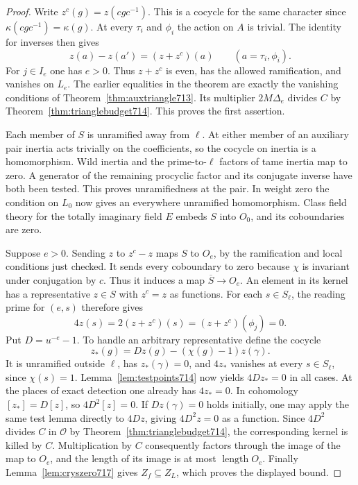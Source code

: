 \documentclass[a4paper,11pt]{article}
\theoremstyle{definition}
\theoremstyle{remark}
\newcommand{\len}{\operatorname{length}}\newcommand{\Res}{\operatorname*{Res}}
\numberwithin{equation}{section}
\begin{document}
\begin{proof}
Write \(z^c(g)=z(cgc^{-1})\). This is a cocycle for the same
character since \(\kappa(cgc^{-1})=\kappa(g)\).
At every \(\tau_i\) and \(\phi_i\) the action on \(A\) is
trivial. The identity for inverses then gives
\[
         z(a)-z(a')=(z+z^c)(a)
           \qquad(a=\tau_i,\phi_i).
\]
For \(j\in I_e\) one has \(e>0\). Thus \(z+z^c\) is even,
has the allowed ramification, and vanishes on \(L_e\).
The earlier equalities in the theorem are exactly the vanishing
conditions of Theorem~\ref{thm:auxtriangle713}. Its multiplier
\(2M\Delta_e\) divides \(C\) by
Theorem~\ref{thm:trianglebudget714}. This proves the first assertion.

Each member of \(S\) is unramified away from \(\ell\).
At either member of an auxiliary pair inertia acts trivially
on the coefficients, so the cocycle on inertia is a homomorphism.
Wild inertia and the prime-to-\(\ell\) factors of tame inertia
map to zero. A generator of the remaining procyclic factor
and its conjugate inverse have both been tested. This proves
unramifiedness at the pair. In weight zero the condition on
\(L_0\) now gives an everywhere unramified homomorphism. Class
field theory for the totally imaginary field \(E\) embeds
\(S\) into \(O_0\), and its coboundaries are zero.

Suppose \(e>0\). Sending \(z\) to \(z^c-z\) maps \(S\)
to \(O_e\), by the ramification and local conditions just
checked. It sends every coboundary to zero because \(\chi\)
is invariant under conjugation by \(c\). Thus it induces
a map \(\overline S\to O_e\). An element in its kernel has
a representative \(z\in S\) with \(z^c=z\) as functions.
For each \(s\in S_\ell\), the reading prime for \((e,s)\)
therefore gives
\[
       4z(s)=2(z+z^c)(s)=(z+z^c)(\phi_j)=0 .
\]
Put \(D=u^{-e}-1\). To handle an arbitrary representative
define the cocycle
\[
            z_*(g)=D z(g)-(\chi(g)-1)z(\gamma).
\]
It is unramified outside \(\ell\), has \(z_*(\gamma)=0\),
and \(4z_*\) vanishes at every \(s\in S_\ell\), since
\(\chi(s)=1\). Lemma~\ref{lem:testpoints714} now yields
\(4D z_*=0\) in all cases. At the places of exact detection
one already has \(4z_*=0\). In cohomology
\([z_*]=D[z]\), so \(4D^2[z]=0\).
If \(Dz(\gamma)=0\) holds initially, one may apply the same
test lemma directly to \(4Dz\), giving \(4D^2z=0\) as a
function. Since \(4D^2\) divides \(C\) in \(\mathcal O\)
by Theorem~\ref{thm:trianglebudget714}, the corresponding
kernel is killed by \(C\). Multiplication by \(C\) consequently
factors through the image of the map to \(O_e\), and the
length of its image is at most \(\len O_e\). Finally
Lemma~\ref{lem:cryszero717} gives \(Z_f\subseteq Z_L\),
which proves the displayed bound.
\end{proof}
\end{document}
